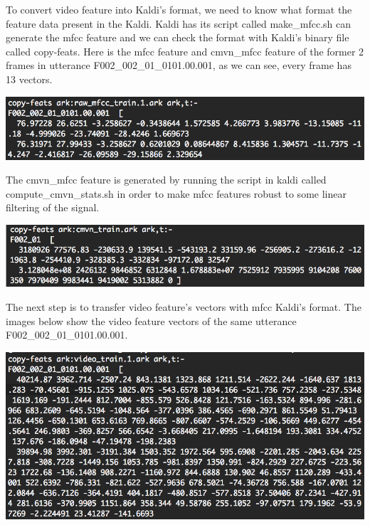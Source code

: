 To convert video feature into Kaldi’s format, we need to know what format the feature data present in the Kaldi. Kaldi has its script called make\_mfcc.sh can generate the mfcc feature and we can check the format with Kaldi’s binary file called copy-feats. Here is the mfcc feature and cmvn\_mfcc feature of the former 2 frames in utterance F002\_002\_01\_0101.00.001, as we can see, every frame has 13 vectors.
\begin{center}
\includegraphics[width=1\linewidth]{images/train_mfcc.png}\\
\label{img:mfcc}
\end{center}
The cmvn\_mfcc feature is generated by running the script in kaldi called compute\_cmvn\_stats.sh in order to make mfcc features robust to some linear filtering of the signal. 
\begin{center}
\includegraphics[width=1\linewidth]{images/cmvn_mfcc.png}\\
\label{img:cmvnmfcc}
\end{center}
The next step is to transfer video feature’s vectors with mfcc Kaldi’s format. The images below show the video feature vectors of the same utterance 
F002\_002\_01\_0101.00.001.
\begin{center}
\includegraphics[width=1\linewidth]{images/train_video.png}\\
\label{img:video}
\end{center}

